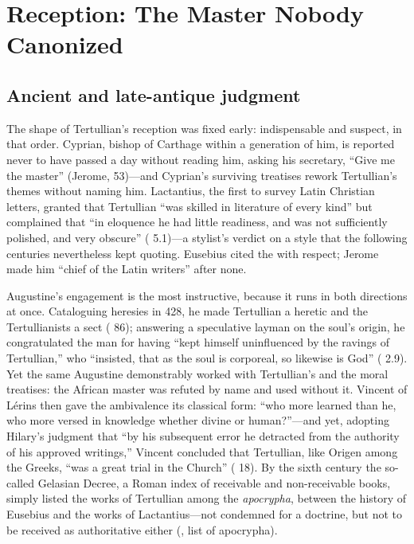 \section{Reception: The Master Nobody Canonized}

\subsection{Ancient and late-antique judgment}

The shape of Tertullian's reception was fixed early: indispensable and
suspect, in that order. Cyprian, bishop of Carthage within a generation of
him, is reported never to have passed a day without reading him, asking his
secretary, ``Give me the master'' (Jerome,  53)---and
Cyprian's surviving treatises rework Tertullian's themes without naming him. Lactantius, the first to survey Latin Christian letters, granted that
Tertullian ``was skilled in literature of every kind'' but complained that ``in
eloquence he had little readiness, and was not sufficiently polished, and very
obscure'' ( 5.1)---a stylist's verdict on a style that
the following centuries nevertheless kept quoting. Eusebius cited the
 with respect; Jerome made him ``chief of the Latin writers''
after none.

Augustine's engagement is the most instructive, because it runs in both
directions at once. Cataloguing heresies in 428, he made Tertullian a heretic
and the Tertullianists a sect ( 86); answering a
speculative layman on the soul's origin, he congratulated the man for having
``kept himself uninfluenced by the ravings of Tertullian,'' who ``insisted,
that as the soul is corporeal, so likewise is God'' ( 2.9). Yet the same Augustine demonstrably worked with
Tertullian's  and the moral treatises: the
African master was refuted by name and used without it. Vincent of L\'erins
then gave the ambivalence its classical form: ``who more learned than he, who
more versed in knowledge whether divine or human?''---and yet, adopting
Hilary's judgment that ``by his subsequent error he detracted from the
authority of his approved writings,'' Vincent concluded that Tertullian, like
Origen among the Greeks, ``was a great trial in the Church''
( 18). By the sixth century the so-called Gelasian
Decree, a Roman index of receivable and non-receivable books, simply listed
the works of Tertullian among the \textit{apocrypha}, between the history of
Eusebius and the works of Lactantius---not condemned for a doctrine, but not
to be received as authoritative either (, list of
apocrypha).

